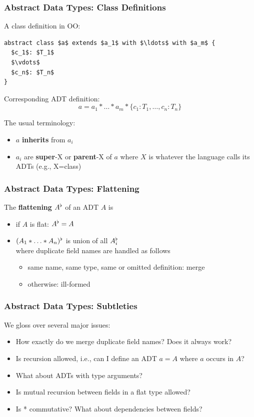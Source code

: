\documentclass{beamer}
\begin{document}
\begin{frame}[fragile]\frametitle{Abstract Data Types: Class Definitions}
A class definition in OO:

\begin{lstlisting}
abstract class $a$ extends $a_1$ with $\ldots$ with $a_m$ {
  $c_1$: $T_1$
  $\vdots$
  $c_n$: $T_n$
}
\end{lstlisting}

Corresponding ADT definition:
\[a = a_1*\ldots*a_m*\{c_1:T_1,\ldots,c_n:T_n\}\]
\medskip

The usual terminology:
\begin{itemize}
\item $a$ \textbf{inherits} from $a_i$
\item $a_i$ are \textbf{super}-X or \textbf{parent}-X of $a$ where $X$ is whatever the language calls its ADTs (e.g., X=class)
\end{itemize}
\end{frame}

\begin{frame}\frametitle{Abstract Data Types: Flattening}
The \textbf{flattening} $A^\flat$ of an ADT $A$ is
\begin{itemize}
 \item if $A$ is flat: $A^\flat=A$
 \item $(A_1*\ldots*A_n)^\flat$ is union of all $A_i^\flat$\\
  where duplicate field names are handled as follows
  \begin{itemize}
   \item same name, same type, same or omitted definition: merge
   \item otherwise: ill-formed
  \end{itemize}
\end{itemize}
\end{frame}

\begin{frame}\frametitle{Abstract Data Types: Subtleties}
We gloss over several major issues:
\begin{itemize}
\item How exactly do we merge duplicate field names? Does it always work?
\item Is recursion allowed, i.e., can I define an ADT $a=A$ where $a$ occurs in $A$?
\item What about ADTs with type arguments?
\item Is mutual recursion between fields in a flat type allowed?
\item Is * commutative? What about dependencies between fields?
\end{itemize}
\end{frame}
\end{document}
